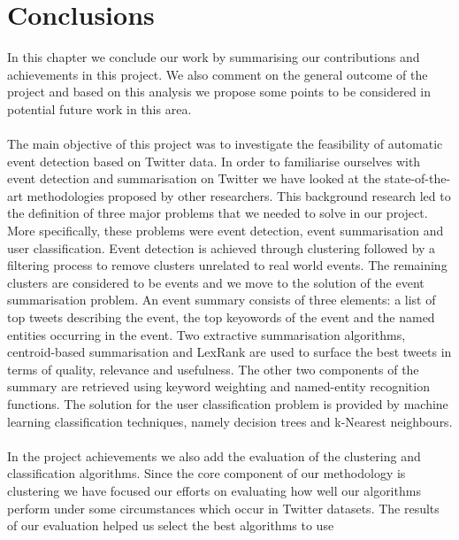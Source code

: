 \def\baselinestretch{1}
\chapter{Conclusions}
\ifpdf
    \graphicspath{{Conclusions/ConclusionsFigs/PNG/}{Conclusions/ConclusionsFigs/PDF/}{Conclusions/ConclusionsFigs/}}
\else
    \graphicspath{{Conclusions/ConclusionsFigs/EPS/}{Conclusions/ConclusionsFigs/}}
\fi

\def\baselinestretch{1.66}

In this chapter we conclude our work by summarising our contributions and achievements in this project. We also comment on the general outcome 
of the project and based on this analysis we propose some points to be considered in potential future work in this area.\\\\
The main objective of this project was to investigate the feasibility of automatic event detection based on Twitter data. In order to 
familiarise ourselves with event detection and summarisation on Twitter we have looked at the state-of-the-art methodologies proposed by other researchers.
This background research led to the definition of three major problems that we needed to solve in our project. More specifically, these problems were
event detection, event summarisation and user classification. Event detection is achieved through clustering followed by a filtering process to remove clusters
unrelated to real world events. The remaining clusters are considered to be events and we move to the solution of the event summarisation problem. An event summary consists 
of three elements: a list of top tweets describing the event, the top keyowords of the event and the named entities occurring in the event. Two extractive summarisation
algorithms, centroid-based summarisation and LexRank are used to surface the best tweets in terms of quality, relevance and usefulness. The other two components of the summary are retrieved
using keyword weighting and named-entity recognition functions. The solution for the user classification problem is provided by machine learning classification techniques, namely decision trees and k-Nearest neighbours.\\\\
In the project achievements we also add the evaluation of the clustering and classification algorithms. Since the core component of our methodology is clustering we have focused our efforts 
on evaluating how well our algorithms perform under some circumstances which occur in Twitter datasets. The results of our evaluation helped us select the best algorithms to use
